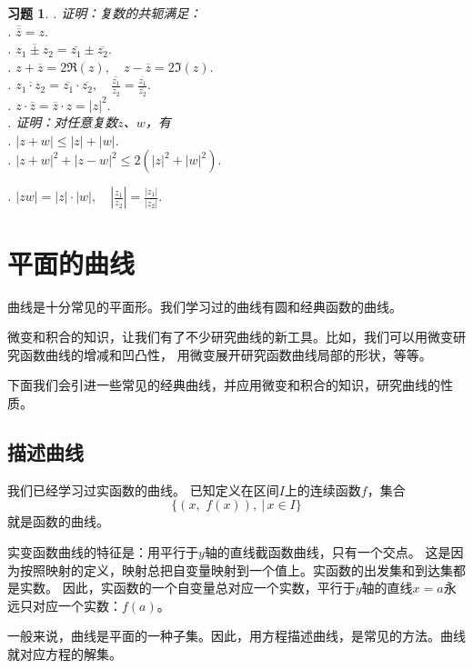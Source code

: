 \documentclass[12pt,UTF8]{ctexbook}
\theoremstyle{definition}
\theoremstyle{plain}
\newtheorem{xt}{习题}[section]
\begin{document}
\begin{xt}
    . 证明：复数的共轭满足：\\
    . $ \overline{\overline{z}} = z.$ \\
    . $ \overline{z_1 \pm z_2} = \overline{z_1}\pm \overline{z_2}.$ \\
    . $ z + \overline{z} = 2\Re(z), \quad z - \overline{z} = 2\Im(z).$\\
    . $\overline{z_1 \cdot z_2} = \overline{z_1}\cdot \overline{z_2}, \quad \overline{\frac{z_1}{z_2}} = \frac{\overline{z_1}}{\overline{z_2}}.$ \\
    . $ z\cdot \overline{z} = \overline{z} \cdot z = |z|^2.$ \\
    . 证明：对任意复数$z$、$w$，有\\
    . $ |z + w| \leqslant |z| + |w|.$ \\
    . $ |z + w|^2 + |z - w|^2 \leqslant 2(|z|^2 + |w|^2).$ 

    . $ \displaystyle|zw| = |z|\cdot |w|, \quad \left|\frac{z_1}{z_2}\right| = \frac{|z_1|}{|z_2|}. $
\end{xt}

\chapter{平面的曲线}

曲线是十分常见的平面形。我们学习过的曲线有圆和经典函数的曲线。

微变和积合的知识，让我们有了不少研究曲线的新工具。比如，我们可以用微变研究函数曲线的增减和凹凸性，
用微变展开研究函数曲线局部的形状，等等。

下面我们会引进一些常见的经典曲线，并应用微变和积合的知识，研究曲线的性质。

\section{描述曲线}

我们已经学习过实函数的曲线。
已知定义在区间$I$上的连续函数$f$，集合
$$ \{(x,\,\,f(x)) ,\ | \, x\in I\}$$
就是函数的曲线。

实变函数曲线的特征是：用平行于$y$轴的直线截函数曲线，只有一个交点。
这是因为按照映射的定义，映射总把自变量映射到一个值上。实函数的出发集和到达集都是实数。
因此，实函数的一个自变量总对应一个实数，平行于$y$轴的直线$x = a$永远只对应一个实数：$f(a)$。

一般来说，曲线是平面的一种子集。因此，用方程描述曲线，是常见的方法。曲线就对应方程的解集。
\end{document}
